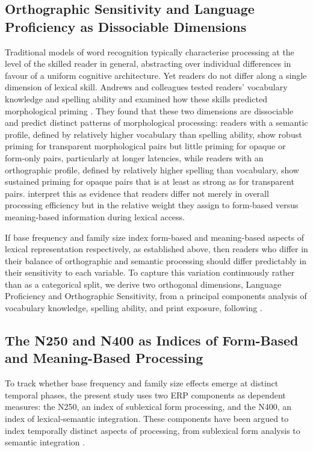 \subsection{Orthographic Sensitivity and Language Proficiency as Dissociable Dimensions}

Traditional models of word recognition typically characterise processing at the level of the skilled reader in general, abstracting over individual differences in favour of a uniform cognitive architecture. Yet readers do not differ along a single dimension of lexical skill. Andrews and colleagues tested readers' vocabulary knowledge and spelling ability and examined how these skills predicted morphological priming \citep{andrewsIndividualDifferencesSkilled2012, andrewsMorphologicalPrimingStronger2013}. They found that these two dimensions are dissociable and predict distinct patterns of morphological processing: readers with a semantic profile, defined by relatively higher vocabulary than spelling ability, show robust priming for transparent morphological pairs but little priming for opaque or form-only pairs, particularly at longer latencies, while readers with an orthographic profile, defined by relatively higher spelling than vocabulary, show sustained priming for opaque pairs that is at least as strong as for transparent pairs. \citet{andrewsMorphologicalPrimingStronger2013} interpret this as evidence that readers differ not merely in overall processing efficiency but in the relative weight they assign to form-based versus meaning-based information during lexical access.

If base frequency and family size index form-based and meaning-based aspects of lexical representation respectively, as established above, then readers who differ in their balance of orthographic and semantic processing should differ predictably in their sensitivity to each variable. To capture this variation continuously rather than as a categorical split, we derive two orthogonal dimensions, Language Proficiency and Orthographic Sensitivity, from a principal components analysis of vocabulary knowledge, spelling ability, and print exposure, following \citet{andrewsMorphologicalPrimingStronger2013}.

\subsection{The N250 and N400 as Indices of Form-Based and Meaning-Based Processing}

To track whether base frequency and family size effects emerge at distinct temporal phases, the present study uses two ERP components as dependent measures: the N250, an index of sublexical form processing, and the N400, an index of lexical-semantic integration. These components have been argued to index temporally distinct aspects of processing, from sublexical form analysis to semantic integration \citep{graingerWatchingWordGo2009}.

